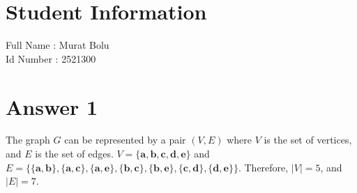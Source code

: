 \documentclass[12pt]{article}
\begin{document}
\section*{Student Information }
Full Name : Murat Bolu \\
Id Number : 2521300 \\

\section*{Answer 1}

The graph $G$ can be represented by a pair $(V, E)$ where $V$ is the set of vertices, and $E$ is the set of edges.
$V = \{\textbf{a}, \textbf{b}, \textbf{c}, \textbf{d}, \textbf{e}\}$ and $E = \{\{\textbf{a}, \textbf{b}\}, \{\textbf{a}, \textbf{c}\}, \{\textbf{a}, \textbf{e}\}, \{\textbf{b}, \textbf{c}\}, \{\textbf{b}, \textbf{e}\}, \{\textbf{c}, \textbf{d}\}, \{\textbf{d}, \textbf{e}\}\}$.
Therefore, $|V| = 5$, and $|E| = 7$.
\end{document}
